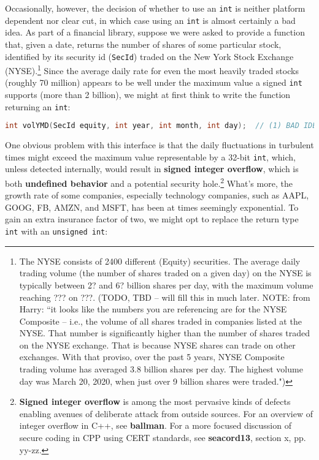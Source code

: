 Occasionally, however, the decision of whether to use an \texttt{int} is
neither platform dependent nor clear cut, in which case using an
\texttt{int} is almost certainly a bad idea. As part of a financial
library, suppose we were asked to provide a function that, given a date,
returns the number of shares of some particular stock, identified by its
security id (\texttt{SecId}) traded on the New York Stock Exchange
(NYSE).\footnote{The NYSE consists of 2400 different (Equity) securities. The average daily trading volume (the number of shares traded on a given day) on the NYSE is typically  between 2? and 6? billion shares per day, with the maximum volume reaching ??? on ???. (TODO, TBD -- will fill this in much later. NOTE: from Harry: ``it looks like the numbers you are referencing are for the NYSE Composite -- i.e., the volume of all shares traded in companies listed at the NYSE. That number is significantly higher than the number of shares traded on the NYSE exchange. That is because NYSE shares can trade on other exchanges. With that proviso, over the past 5 years, NYSE Composite trading volume has averaged 3.8 billion shares per day. The highest volume day was March 20, 2020, when just over 9 billion shares were traded.")} Since the average daily rate
for even the most heavily traded stocks (roughly 70 million) appears to
be well under the maximum value a signed \texttt{int} supports (more
than 2 billion), we might at first think to write the function
returning an \texttt{int}:

\begin{lstlisting}[language=C++]
int volYMD(SecId equity, int year, int month, int day);  // (1) BAD IDEA
\end{lstlisting}
    
\noindent One obvious problem with this interface is that the daily fluctuations
in turbulent times might exceed the maximum value representable by a
32-bit \texttt{int}, which, unless detected internally, would result in
\textbf{signed integer overflow}, which is both \textbf{undefined
behavior} and a potential security hole.{\cprotect\footnote{\textbf{Signed
integer overflow} is among the most pervasive kinds of defects
enabling avenues of deliberate attack from outside sources. For an overview of integer overflow in C++, see \textbf{ballman}. For a more focused discussion of secure coding in CPP using CERT standards, see \textbf{seacord13}, section x, pp. yy-zz.}} What's more, the growth rate of some companies,
especially technology companies, such as AAPL, GOOG, FB, AMZN, and MSFT, has
been at times seemingly exponential. To gain an extra
insurance factor of two, we might opt to replace the return type
\texttt{int} with an \texttt{unsigned}~\texttt{int}:

